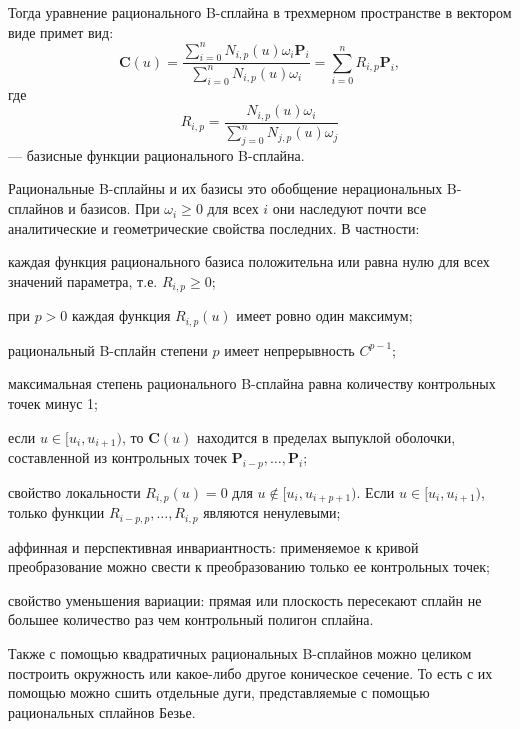 \documentclass{bmstu}
\newenvironment{gost-itemize}
{\begin{itemize}[label=---,itemindent=\parindent,leftmargin=0pt]}
	{\end{itemize}}
\begin{document}
Тогда уравнение рационального B-сплайна в трехмерном пространстве в вектором виде примет вид:
\begin{equation}\label{ratcurve}
    \mathbf{C}(u) = \frac{\sum\limits_{i=0}^nN_{i,p}(u)\omega_i\mathbf{P}_i}{\sum\limits_{i=0}^nN_{i,p}(u)\omega_i}=\sum\limits_{i=0}^nR_{i,p}\mathbf{P}_i,
\end{equation}
где
\begin{equation*}
    R_{i,p} = \frac{N_{i,p}(u)\omega_i}{\sum\limits_{j=0}^nN_{j,p}(u)\omega_j}
\end{equation*}
 --- базисные функции рационального B-сплайна.

Рациональные B-сплайны и их базисы это обобщение нерациональных
B-сплайнов и базисов. При $\omega_i \ge 0$ для всех $i$ они наследуют почти все
аналитические и геометрические свойства последних. В частности:
\begin{gost-itemize}
    \item каждая функция рационального базиса положительна или равна нулю для всех значений параметра, т.е. $R_{i,p}\ge0$;
    \item при $p > 0$ каждая функция $R_{i, p}(u)$ имеет ровно один максимум;
    \item рациональный B-сплайн степени $p$ имеет непрерывность $C^{p-1}$;
    \item максимальная степень рационального B-сплайна равна количеству контрольных точек минус 1;
    \item если $u\in[u_i, u_{i+1})$, то $\mathbf{C}(u)$ находится в пределах выпуклой оболочки, составленной из контрольных точек $\mathbf{P}_{i-p},\dots,\mathbf{P}_{i}$;
    \item свойство локальности $R_{i,p}(u)=0$ для $u\notin[u_i, u_{i+p+1})$. Если $u\in[u_i, u_{i+1})$, только функции $R_{i-p, p},\dots,R_{i,p}$ являются ненулевыми;
    \item аффинная и перспективная инвариантность: применяемое к кривой
    преобразование можно свести к преобразованию только ее
    контрольных точек;
    \item свойство уменьшения вариации: прямая или плоскость пересекают
    сплайн не большее количество раз чем контрольный полигон сплайна.
\end{gost-itemize}

Также с помощью квадратичных рациональных B-сплайнов можно целиком построить окружность или какое-либо другое коническое сечение. То есть с их помощью можно сшить отдельные дуги, представляемые с помощью рациональных сплайнов Безье. 
\end{document}
